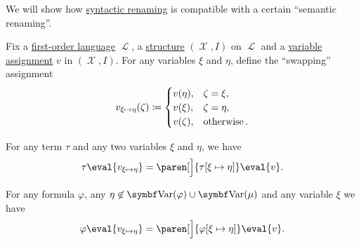 \begin{proposition}\label{thm:swapping_assignment_compatibility}
  We will show how \hyperref[rem:first_order_substitution_renaming_justification]{syntactic renaming} is compatible with a certain \enquote{semantic renaming}.

  Fix a \hyperref[def:first_order_syntax]{first-order language} \( \mscrL \), a \hyperref[def:first_order_structure]{structure} \( (\mscrX, I) \) on \( \mscrL \) and a \hyperref[def:first_order_valuation/variable_assignment]{variable assignment} \( v \) in \( (\mscrX, I) \). For any variables \( \xi \) and \( \eta \), define the \enquote{swapping} assignment
  \begin{equation}\label{eq:thm:swapping_assignment_compatibility/swapping_assignment}
    v_{\xi \mapsto \eta}(\zeta) \coloneqq \begin{cases}
      v(\eta),  &\zeta = \xi, \\
      v(\xi),   &\zeta = \eta, \\
      v(\zeta), &\mathop{\text{otherwise}}.
    \end{cases}
  \end{equation}

  \begin{propenum}
     For any term \( \tau \) and any two variables \( \xi \) and \( \eta \), we have
    \begin{equation}\label{eq:thm:swapping_assignment_compatibility/terms}
      \tau\eval{v_{\xi \mapsto \eta}}
      =
      \paren[\Big]{ \tau[\xi \mapsto \eta] }\eval{v}.
    \end{equation}

     For any formula \( \varphi \), any \( \eta \not\in \bfop{Var}(\varphi) \cup \bfop{Var}(\mu) \) and any variable \( \xi \) we have
    \begin{equation}\label{eq:thm:swapping_assignment_compatibility/formulas}
      \varphi\eval{v_{\xi \mapsto \eta}}
      =
      \paren[\Big]{ \varphi[\xi \mapsto \eta] }\eval{v}.
    \end{equation}
  \end{propenum}
\end{proposition}
